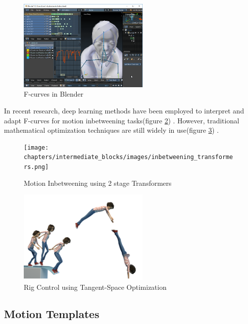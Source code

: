 \documentclass[../../main.tex]{subfiles}
\begin{document}
\begin{figure}
    \centering \includegraphics[width = 2.5in]{chapters/intermediate_blocks/images/fcurves_blender.png}
    \caption{F-curves in Blender}
    \label{fig:fcurves_blender}
\end{figure}

In recent research, deep learning methods have been employed to interpret and adapt F-curves for motion inbetweening tasks(figure \ref{fig:inbetweening_transformers}) \cite{10.1145/3550454.3555454}. However, traditional mathematical optimization techniques are still widely in use(figure \ref{fig:inbetweening_disney}) \cite{10.1145/3306346.3322938}.

\begin{figure}
    \centering \texttt{[image: chapters/intermediate\_blocks/images/inbetweening\_transformers.png]}
    \caption{Motion Inbetweening using 2 stage Transformers \cite{10.1145/3306346.3322938}}
    \label{fig:inbetweening_transformers}
\end{figure}

\begin{figure}
    \centering \includegraphics[width = 2.5in]{chapters/intermediate_blocks/images/inbetweening_disney.png}
    \caption{Rig Control using Tangent-Space Optimization}
    \label{fig:inbetweening_disney}
\end{figure}


\subsection{Motion Templates}
\end{document}
